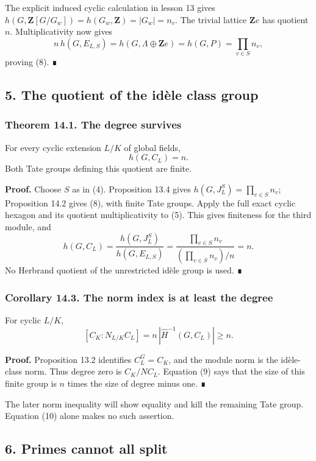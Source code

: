\documentclass[11pt,a4paper]{article}
\begin{document}
The explicit induced cyclic calculation in lesson 13 gives
\(h(G,\mathbf Z[G/G_w])=h(G_w,\mathbf Z)=|G_w|=n_v\). The trivial
lattice \(\mathbf Z e\) has quotient \(n\). Multiplicativity now gives
\[
n\,h(G,E_{L,S})=h(G,\Lambda\oplus\mathbf Z e)
              =h(G,P)=\prod_{v\in S}n_v,
\] proving (8). ∎

\subsection{5. The quotient of the idèle class
group}\label{the-quotient-of-the-iduxe8le-class-group}

\subsubsection{Theorem 14.1. The degree
survives}\label{theorem-14.1.-the-degree-survives}

For every cyclic extension \(L/K\) of global fields, \[
h(G,C_L)=n.
\tag{9}
\] Both Tate groups defining this quotient are finite.

\textbf{Proof.} Choose \(S\) as in (4). Proposition 13.4 gives
\(h(G,J_L^S)=\prod_{v\in S}n_v\); Proposition 14.2 gives (8), with
finite Tate groups. Apply the full exact cyclic hexagon and its quotient
multiplicativity to (5). This gives finiteness for the third module, and
\[
h(G,C_L)=\frac{h(G,J_L^S)}{h(G,E_{L,S})}
        =\frac{\prod_{v\in S}n_v}{(\prod_{v\in S}n_v)/n}=n.
\] No Herbrand quotient of the unrestricted idèle group is used. ∎

\subsubsection{Corollary 14.3. The norm index is at least the
degree}\label{corollary-14.3.-the-norm-index-is-at-least-the-degree}

For cyclic \(L/K\), \[
[C_K:N_{L/K}C_L]
=n\,|\widehat H^{-1}(G,C_L)|\geq n.
\tag{10}
\]

\textbf{Proof.} Proposition 13.2 identifies \(C_L^G=C_K\), and the
module norm is the idèle-class norm. Thus degree zero is \(C_K/N C_L\).
Equation (9) says that the size of this finite group is \(n\) times the
size of degree minus one. ∎

The later norm inequality will show equality and kill the remaining Tate
group. Equation (10) alone makes no such assertion.

\subsection{6. Primes cannot all split}\label{primes-cannot-all-split}
\end{document}
